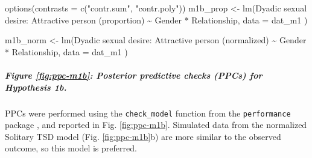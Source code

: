 \documentclass[
  bookmarksnumbered]{article}
\newenvironment{Shaded}{\begin{snugshade}}{\end{snugshade}}
\newcommand{\AttributeTok}[1]{\textcolor[rgb]{0.80,0.80,0.80}{#1}}
\newcommand{\FunctionTok}[1]{\textcolor[rgb]{0.94,0.94,0.56}{#1}}
\newcommand{\NormalTok}[1]{\textcolor[rgb]{0.80,0.80,0.80}{#1}}
\newcommand{\OtherTok}[1]{\textcolor[rgb]{0.94,0.94,0.56}{#1}}
\newcommand{\SpecialCharTok}[1]{\textcolor[rgb]{0.86,0.64,0.64}{#1}}
\newcommand{\StringTok}[1]{\textcolor[rgb]{0.80,0.58,0.58}{#1}}
\begin{document}
\begin{Shaded}
\begin{Highlighting}[]
\FunctionTok{options}\NormalTok{(}\AttributeTok{contrasts =} \FunctionTok{c}\NormalTok{(}\StringTok{"contr.sum"}\NormalTok{, }\StringTok{"contr.poly"}\NormalTok{))}
\NormalTok{m1b\_prop }\OtherTok{\textless{}{-}} \FunctionTok{lm}\NormalTok{(}\StringTok{\textasciigrave{}}\AttributeTok{Dyadic sexual desire: Attractive person (proportion)}\StringTok{\textasciigrave{}} \SpecialCharTok{\textasciitilde{}}\NormalTok{ Gender }\SpecialCharTok{*}\NormalTok{ Relationship,}
  \AttributeTok{data =}\NormalTok{ dat\_m1}
\NormalTok{)}

\NormalTok{m1b\_norm }\OtherTok{\textless{}{-}} \FunctionTok{lm}\NormalTok{(}\StringTok{\textasciigrave{}}\AttributeTok{Dyadic sexual desire: Attractive person (normalized)}\StringTok{\textasciigrave{}} \SpecialCharTok{\textasciitilde{}}\NormalTok{ Gender }\SpecialCharTok{*}\NormalTok{ Relationship,}
  \AttributeTok{data =}\NormalTok{ dat\_m1}
\NormalTok{)}
\end{Highlighting}
\end{Shaded}

\subparagraph{Figure \ref{fig:ppc-m1b}: Posterior predictive checks (PPCs) for Hypothesis 1b.}\label{figure-reffigppc-m1b-posterior-predictive-checks-ppcs-for-hypothesis-1b.}

PPCs were performed using the \texttt{check\_model} function from the \texttt{performance} package \autocite{ludecke2021}, and reported in Fig. \ref{fig:ppc-m1b}. Simulated data from the normalized Solitary TSD model (Fig. \ref{fig:ppc-m1b}b) are more similar to the observed outcome, so this model is preferred.
\end{document}
